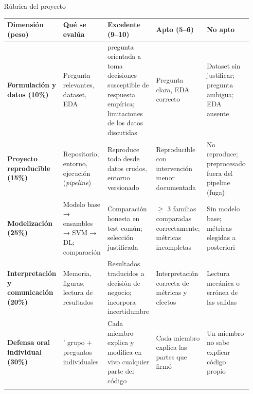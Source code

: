 \documentclass[
  8pt,
  ignorenonframetext,
  aspectratio=169,
  spanish,
]{beamer}
\newcommand{\lightrowrule}{\arrayrulecolor{black!25}\specialrule{0.4pt}{1pt}{1pt}\arrayrulecolor{black}}
\begin{document}
\begin{frame}[shrink]{Rúbrica del proyecto}
\label{ruxfabrica-del-proyecto}
~

\begin{longtable}[]{@{}
  >{\raggedright\arraybackslash}p{}
  >{\raggedright\arraybackslash}p{}
  >{\raggedright\arraybackslash}p{}
  >{\raggedright\arraybackslash}p{}
  >{\raggedright\arraybackslash}p{}@{}}
\toprule\noalign{}
\begin{minipage}[b]{\linewidth}\raggedright
\textbf{Dimensión (peso)}
\end{minipage} & \begin{minipage}[b]{\linewidth}\raggedright
\textbf{Qué se evalúa}
\end{minipage} & \begin{minipage}[b]{\linewidth}\raggedright
\textbf{Excelente (9--10)}
\end{minipage} & \begin{minipage}[b]{\linewidth}\raggedright
\textbf{Apto (5--6)}
\end{minipage} & \begin{minipage}[b]{\linewidth}\raggedright
\textbf{No apto}
\end{minipage} \\
\midrule\noalign{}
\endhead
\bottomrule\noalign{}
\endlastfoot
\textbf{Formulación y datos (10\%)} & Pregunta relevantes, dataset, EDA
& pregunta orientada a toma decisiones susceptible de respuesta
empírica; limitaciones de los datos discutidas & Pregunta clara, EDA
correcto & Dataset sin justificar; pregunta ambigua; EDA ausente \\ \lightrowrule
\textbf{Proyecto reproducible (15\%)} & Repositorio, entorno, ejecución
(\emph{pipeline}) & Reproduce todo desde datos crudos, entorno
versionado & Reproducible con intervención menor documentada & No
reproduce; preprocesado fuera del pipeline (fuga) \\ \lightrowrule
\textbf{Modelización (25\%)} & Modelo base → ensambles → SVM → DL;
comparación & Comparación honesta en test común; selección justificada &
\(\geq\) 3 familias comparadas correctamente; métricas incompletas & Sin
modelo base; métricas elegidas a posteriori \\ \lightrowrule
\textbf{Interpretación y comunicación (20\%)} & Memoria, figuras,
lectura de resultados & Resultados traducidos a decisión de negocio;
incorpora incertidumbre & Interpretación correcta de métricas y efectos
& Lectura mecánica o errónea de las salidas \\ \lightrowrule
\textbf{Defensa oral individual (30\%)} & 10' grupo + preguntas
individuales & Cada miembro explica y modifica en vivo cualquier parte
del código & Cada miembro explica las partes que firmó & Un miembro no
sabe explicar código propio \\ \lightrowrule
\end{longtable}


\end{frame}
\end{document}
